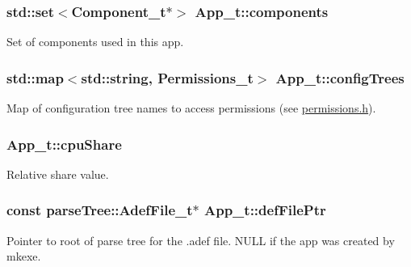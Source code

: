 \subsubsection[{\texorpdfstring{components}{components}}]{\setlength{\rightskip}{0pt plus 5cm}std\+::set$<${\bf Component\+\_\+t}$\ast$$>$ App\+\_\+t\+::components}\hypertarget{struct_app__t_a1012eb56314c12edc21188341976bed1}{}\label{struct_app__t_a1012eb56314c12edc21188341976bed1}


Set of components used in this app. 

\subsubsection[{\texorpdfstring{config\+Trees}{configTrees}}]{\setlength{\rightskip}{0pt plus 5cm}std\+::map$<$std\+::string, {\bf Permissions\+\_\+t}$>$ App\+\_\+t\+::config\+Trees}\hypertarget{struct_app__t_a4820d5f23eee5a900fc3a656353b8bdb}{}\label{struct_app__t_a4820d5f23eee5a900fc3a656353b8bdb}


Map of configuration tree names to access permissions (see \hyperlink{permissions_8h}{permissions.\+h}). 

\subsubsection[{\texorpdfstring{cpu\+Share}{cpuShare}}]{ App\+\_\+t\+::cpu\+Share}\hypertarget{struct_app__t_a97ab412b8d66acce26d69c01aa0727a8}{}\label{struct_app__t_a97ab412b8d66acce26d69c01aa0727a8}


Relative share value. 

\subsubsection[{\texorpdfstring{def\+File\+Ptr}{defFilePtr}}]{\setlength{\rightskip}{0pt plus 5cm}const {\bf parse\+Tree\+::\+Adef\+File\+\_\+t}$\ast$ App\+\_\+t\+::def\+File\+Ptr}\hypertarget{struct_app__t_a6e4cbcd141b4a7ab32c9bda0808657a5}{}\label{struct_app__t_a6e4cbcd141b4a7ab32c9bda0808657a5}
Pointer to root of parse tree for the .adef file. N\+U\+LL if the app was created by mkexe. 
